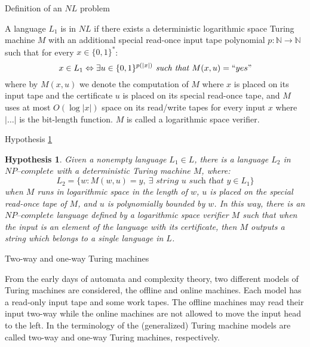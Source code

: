 \documentclass[11pt]{beamer}
\newtheorem{hypothesis}[theorem]{Hypothesis}
\begin{document}
\begin{frame}{Definition of an $NL$ problem}

\begin{definition}
A language $L_{1}$ is in $NL$ if there exists a deterministic logarithmic space Turing machine $M$ with an additional special read-once input tape polynomial $p: \mathbb{N} \rightarrow \mathbb{N}$ such that for every $x \in \{0, 1\}^{*}$:
\[x \in L_{1} \Leftrightarrow \exists u \in \{0, 1\}^{p(|x|)} \textit{ such that } M(x, u) = ``yes" \]
where by $M(x, u)$ we denote the computation of $M$ where $x$ is placed on its input tape and the certificate $u$ is placed on its special read-once tape, and $M$ uses at most $O(\log |x|)$ space on its read/write tapes for every input $x$ where $|\ldots|$ is the bit-length function. $M$ is called a logarithmic space verifier.
\end{definition}

\end{frame}

\begin{frame}{Hypothesis \ref{hypothesis1}}

\begin{hypothesis}
\label{hypothesis1}
Given a nonempty language $L_{1} \in L$, there is a language $L_{2}$ in $\textit{NP--complete}$ with a deterministic Turing machine $M$, where:
\[L_{2} = \{w: M(w, u) = y, \ \exists \textit{ string } u \textit{ such that } y \in L_{1}\}\]
when $M$ runs in logarithmic space in the length of $w$, $u$ is placed on the special read-once tape of $M$, and $u$ is polynomially bounded by $w$. In this way, there is an $\textit{NP--complete}$ language defined by a logarithmic space verifier $M$ such that when the input is an element of the language with its certificate, then $M$ outputs a string which belongs to a single language in $L$.
\end{hypothesis}

\end{frame}

\begin{frame}{Two-way and one-way Turing machines}

From the early days of automata and complexity  theory,  two  different  models  of  Turing  machines  are  considered, the offline and online machines. Each model has a read-only input tape and some work tapes. The offline machines may read their input two-way while the online machines are not allowed to move the input head to the left. In the terminology of the (generalized) Turing machine models are called two-way and one-way Turing machines, respectively.

\end{frame}
\end{document}
